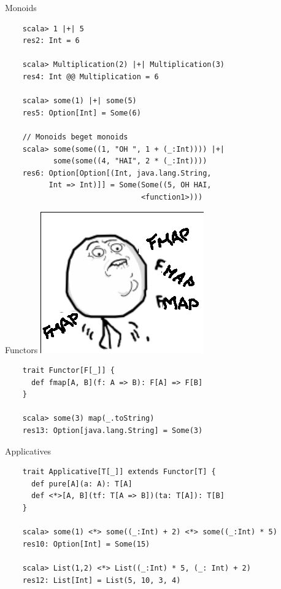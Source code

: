 \documentclass{beamer}
\begin{document}
\begin{frame}[fragile]{Monoids}
  \begin{verbatim}
    scala> 1 |+| 5
    res2: Int = 6

    scala> Multiplication(2) |+| Multiplication(3)
    res4: Int @@ Multiplication = 6

    scala> some(1) |+| some(5)
    res5: Option[Int] = Some(6)

    // Monoids beget monoids
    scala> some(some((1, "OH ", 1 + (_:Int)))) |+|
           some(some((4, "HAI", 2 * (_:Int))))
    res6: Option[Option[(Int, java.lang.String,
          Int => Int)]] = Some(Some((5, OH HAI,
                               <function1>)))
  \end{verbatim}
\end{frame}

\begin{frame}[fragile]{Functors}
  \includegraphics[scale=0.5]{fmapfmapfmap}
  \begin{verbatim}
    trait Functor[F[_]] {
      def fmap[A, B](f: A => B): F[A] => F[B]
    }

    scala> some(3) map(_.toString)
    res13: Option[java.lang.String] = Some(3)
  \end{verbatim}
\end{frame}

\begin{frame}[fragile]{Applicatives}
    \begin{verbatim}
    trait Applicative[T[_]] extends Functor[T] {
      def pure[A](a: A): T[A]
      def <*>[A, B](tf: T[A => B])(ta: T[A]): T[B]
    }

    scala> some(1) <*> some((_:Int) + 2) <*> some((_:Int) * 5)
    res10: Option[Int] = Some(15)

    scala> List(1,2) <*> List((_:Int) * 5, (_: Int) + 2)
    res12: List[Int] = List(5, 10, 3, 4)
  \end{verbatim}
\end{frame}
\end{document}
